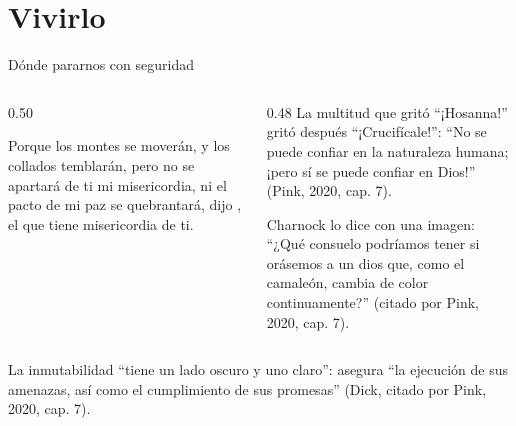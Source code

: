 \section{Vivirlo}

\begin{frame}{Dónde pararnos con seguridad}
\begin{columns}[t,onlytextwidth]
\begin{column}{0.50\textwidth}
\begin{cita}Porque los montes se moverán, y los collados temblarán, pero no se apartará de ti mi misericordia, ni el pacto de mi paz se quebrantará, dijo \SENOR, el que tiene misericordia de ti.\end{cita}
\end{column}
\begin{column}{0.48\textwidth}\small
La multitud que gritó ``¡Hosanna!'' gritó después ``¡Crucifícale!'': ``No se puede confiar en la naturaleza humana; ¡pero sí se puede confiar en Dios!'' (Pink, 2020, cap. 7).\par\medskip
Charnock lo dice con una imagen: ``¿Qué consuelo podríamos tener si orásemos a un dios que, como el camaleón, cambia de color continuamente?'' (citado por Pink, 2020, cap. 7).
\end{column}
\end{columns}\par\smallskip
\begin{tcolorbox}[colback=papiro,colframe=dorado,boxrule=1.2pt,arc=3pt]
\small La inmutabilidad ``tiene un lado oscuro y uno claro'': asegura ``la ejecución de sus amenazas, así como el cumplimiento de sus promesas'' (Dick, citado por Pink, 2020, cap. 7).
\end{tcolorbox}
\end{frame}

